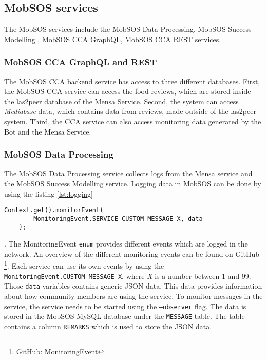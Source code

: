 \subsection{MobSOS services}
The MobSOS services include the MobSOS Data Processing, MobSOS Success Modelling , MobSOS CCA GraphQL, MobSOS CCA REST services.

\subsubsection{MobSOS CCA GraphQL and REST}
The MobSOS CCA backend service has access to three different databases. First, the MobSOS CCA service can access the food reviews, which are stored inside the las2peer database of the Mensa Service. Second, the system can access \emph{Mediabase} data, which contains data from reviews, made outside of the las2peer system. 
Third, the CCA service can also access monitoring data generated by the Bot and the Mensa Service. 


\subsubsection{MobSOS Data Processing}
The MobSOS Data Processing service collects logs from the Mensa service and the MobSOS Success Modelling service. 
Logging data in MobSOS can be done by using the listing \ref{lst:logging}
\begin{lstlisting}[caption=Example use of a MonitoringEvent,captionpos=b,label={lst:logging}]
    Context.get().monitorEvent(
        MonitoringEvent.SERVICE_CUSTOM_MESSAGE_X, data
    );
\end{lstlisting}.
The MonitoringEvent \texttt{enum} provides different events which are logged in the network. An overview of the different monitoring events can be found on GitHub \footnote{\href{https://github.com/rwth-acis/mobsos-data-processing/wiki/Built-In-Monitoring-Events}{GitHub: MonitoringEvent}}. 
Each service can use its own events by using the \texttt{MonitoringEvent.CUSTOM\_MESSAGE\_X}, where \emph{X} is a number between 1 and 99. 
Those \texttt{data} variables contains generic JSON data. This data provides information about how community members are using the service.
To monitor messages in the service, the service needs to be started using the \texttt{--observer} flag.
The data is stored in the MobSOS MySQL database under the \texttt{MESSAGE} table. The table contains a column \texttt{REMARKS} which is used to store the JSON data.

